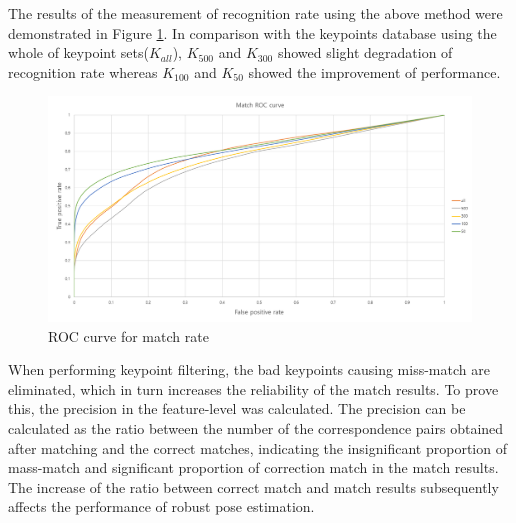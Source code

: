 
The results of the measurement of recognition rate using the above method were demonstrated in Figure \ref{fig:markerless_roc}. In comparison with the keypoints database using the whole of keypoint sets($K_{all}$), $K_{500}$ and $K_{300}$ showed slight degradation of recognition rate whereas $K_{100}$ and $K_{50}$ showed the improvement of performance.  



\begin{figure}[ht!]
\centering
\includegraphics[width=1.0\columnwidth]{4_experiments/roc}
\caption{ROC curve for match rate}
\label{fig:markerless_roc}
\end{figure}


When performing keypoint filtering, the bad keypoints causing miss-match are eliminated, which in turn increases the reliability of the match results. To prove this, the precision\cite{heinly_comparative_2012} in the feature-level was calculated. The precision can be calculated as the ratio between the number of the correspondence pairs obtained after matching and the correct matches, indicating the insignificant proportion of mass-match and significant proportion of correction match in the match results. The increase of the ratio between correct match and match results subsequently affects the performance of robust pose estimation. 


